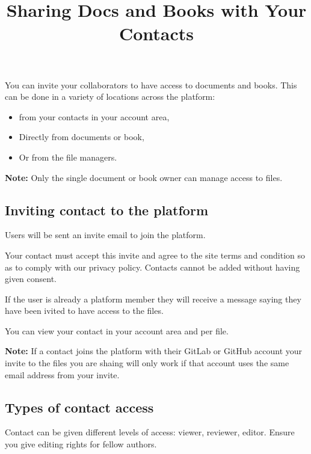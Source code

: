 \documentclass{article}
\begin{document}
\title{Sharing Docs and Books with Your Contacts}

\maketitle


You can invite your collaborators to have access to documents and books. This can be done in a variety of locations across the platform:

\begin{itemize}
\item from your contacts in your account area,


\item Directly from documents or book,


\item Or from the file managers.


\end{itemize}

\textbf{Note:} Only the single document or book owner can manage access to files.


\subsection{Inviting contact to the platform}\label{H4501110}



Users will be sent an invite email to join the platform. 


Your contact must accept this invite and agree to the site terms and condition so as to comply with our privacy policy. Contacts cannot be added without having given consent.


If the user is already a platform member they will receive a message saying they have been ivited to have access to the files.


You can view your contact in your account area and per file.


\textbf{Note:} If a contact joins the platform with their GitLab or GitHub account your invite to the files you are shaing will only work if that account uses the same email address from your invite.


\subsection{Types of contact access}\label{H3388152}



Contact can be given different levels of access: viewer, reviewer, editor. Ensure you give editing rights for fellow authors.
\end{document}
